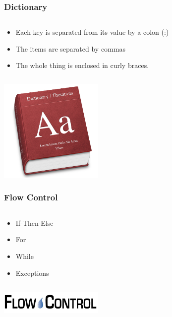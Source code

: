 \documentclass{beamer}
\begin{document}
\begin{frame}
	\frametitle{Dictionary}
	\begin{columns}[c]
		\begin{column}{30cm}
			\vspace{.1cm}
			\begin{itemize}
				\justifying
				\item Each key is separated from its value by a colon (:)
				\item The items are separated by commas
				\item The whole thing is enclosed in curly braces.
			\end{itemize}
		\end{column}
	\end{columns}
	\vspace{.5cm}
	\hspace*{5.5cm} \includegraphics[width=5cm]{figs/dictionary.jpg}
\end{frame}

\begin{frame}
	\frametitle{Flow Control}
	\begin{columns}[c]
		\begin{column}{30cm}
			\vspace{.1cm}
			\begin{itemize}
				\justifying
				\item If-Then-Else
				\item For
				\item While
				\item Exceptions
			\end{itemize}
		\end{column}
	\end{columns}
	\vspace{.5cm}
	\hspace*{5.5cm} \includegraphics[width=5cm]{figs/flow-control.jpg}
\end{frame}
\end{document}
